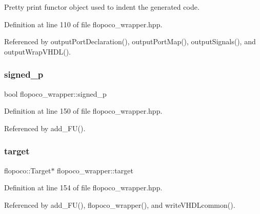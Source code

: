 Pretty print functor object used to indent the generated code. 



Definition at line 110 of file flopoco\+\_\+wrapper.\+hpp.



Referenced by output\+Port\+Declaration(), output\+Port\+Map(), output\+Signals(), and output\+Wrap\+V\+H\+D\+L().

\mbox{\label{classflopoco__wrapper_ae20312084bdfebdcdff953831960a990}} 
\subsubsection{\texorpdfstring{signed\+\_\+p}{signed\_p}}
{\footnotesize\ttfamily bool flopoco\+\_\+wrapper\+::signed\+\_\+p\hspace{0.3cm}{\ttfamily [private]}}



Definition at line 150 of file flopoco\+\_\+wrapper.\+hpp.



Referenced by add\+\_\+\+F\+U().

\mbox{\label{classflopoco__wrapper_a6a7d2c36ac45fb5a5c14e33134df2855}} 
\subsubsection{\texorpdfstring{target}{target}}
{\footnotesize\ttfamily flopoco\+::\+Target$\ast$ flopoco\+\_\+wrapper\+::target\hspace{0.3cm}{\ttfamily [private]}}



Definition at line 154 of file flopoco\+\_\+wrapper.\+hpp.



Referenced by add\+\_\+\+F\+U(), flopoco\+\_\+wrapper(), and write\+V\+H\+D\+Lcommon().

\mbox{\label{classflopoco__wrapper_aa187461f66472ae2d77d3c8425895de7}} 
